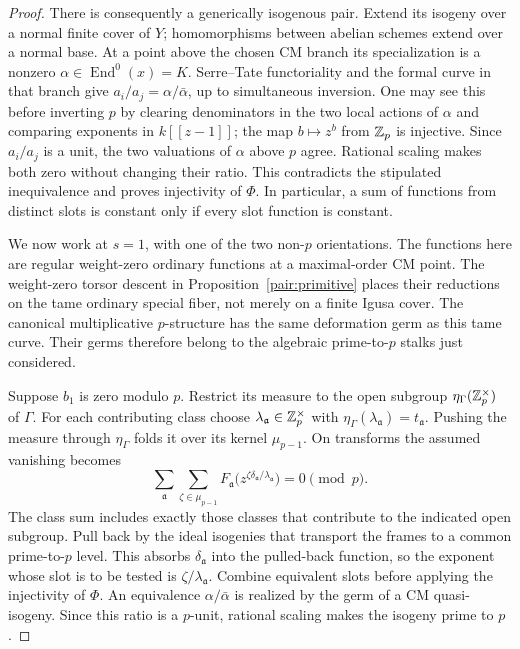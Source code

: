 \begin{proof}
There is consequently a generically isogenous pair.  Extend its
isogeny over a normal finite cover of \(Y\); homomorphisms between
abelian schemes extend over a normal base.  At a point above the
chosen CM branch its specialization is a nonzero
\(\alpha\in\operatorname{End}^0(x)=K\).  Serre--Tate functoriality
and the formal curve in that branch give
\(a_i/a_j=\alpha/\bar\alpha\), up to simultaneous inversion.
One may see this before inverting \(p\) by clearing denominators
in the two local actions of \(\alpha\) and comparing exponents in
\(k[[z-1]]\); the map \(b\mapsto z^b\) from \(\mathbb Z_p\) is
injective.  Since \(a_i/a_j\) is a unit, the two valuations of
\(\alpha\) above \(p\) agree.  Rational scaling makes both zero
without changing their ratio.  This contradicts the stipulated
inequivalence and proves injectivity of \(\Phi\).  In particular,
a sum of functions from distinct slots is constant only if every
slot function is constant.

We now work at \(s=1\), with one of the two non-\(p\) orientations.
The functions here are regular weight-zero ordinary functions at a
maximal-order CM point.  The weight-zero torsor descent in
Proposition~\ref{pair:primitive} places their reductions on the tame
ordinary special fiber, not merely on a finite Igusa cover.
The canonical multiplicative \(p\)-structure has the same deformation
germ as this tame curve.  Their germs therefore belong to the
algebraic prime-to-\(p\) stalks just considered.

Suppose \(b_1\) is zero modulo \(p\).  Restrict its measure to the
open subgroup \(\eta_\Gamma(\mathbb Z_p^\times)\) of \(\Gamma\).
For each contributing class choose
\(\lambda_{\mathfrak a}\in\mathbb Z_p^\times\) with
\(\eta_\Gamma(\lambda_{\mathfrak a})=t_{\mathfrak a}\).
Pushing the measure through \(\eta_\Gamma\) folds it over its kernel
\(\mu_{p-1}\).  On transforms the assumed vanishing becomes
\[
 \sum_{\mathfrak a}\sum_{\zeta\in\mu_{p-1}}
 F_{\mathfrak a}
     \bigl(z^{\zeta\delta_{\mathfrak a}/\lambda_{\mathfrak a}}\bigr)
       =0\pmod p.
\]
The class sum includes exactly those classes that contribute to
the indicated open subgroup.  Pull back by the ideal isogenies that
transport the frames to a common prime-to-\(p\) level.  This absorbs
\(\delta_{\mathfrak a}\) into the pulled-back function, so the
exponent whose slot is to be tested is
\(\zeta/\lambda_{\mathfrak a}\).  Combine equivalent slots before
applying the injectivity of \(\Phi\).
An equivalence \(\alpha/\bar\alpha\) is realized by the germ of a CM
quasi-isogeny.  Since this ratio is a \(p\)-unit, rational scaling
makes the isogeny prime to \(p\).


\end{proof}

